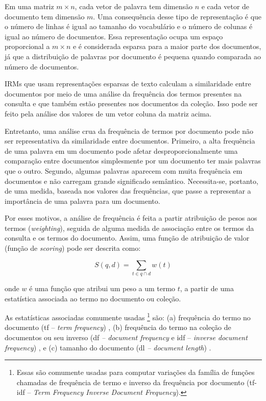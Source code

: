 \documentclass[
	12pt,				%
	openright,			%
	oneside,			%
	a4paper,			%
	english,			%
	french,				%
	spanish,			%
	brazil				%
	]{abntex2}
\begin{document}
Em uma matriz $m \times n$, cada vetor de palavra tem dimensão $n$ e cada vetor de documento tem dimensão $m$.
Uma consequência desse tipo de representação é que o número de linhas é igual ao tamanho do vocabulário e o número de colunas é igual ao número de documentos.
Essa representação ocupa um espaço proporcional a $m \times n$ e é considerada esparsa para a maior parte dos documentos, já que a distribuição de palavras por documento é pequena quando comparada ao número de documentos.
\cite{JurafskyMartin2023}


IRMs que usam representações esparsas de texto calculam a similaridade entre documentos por meio de uma análise da frequência dos termos presentes na consulta e que também estão presentes nos documentos da coleção.
Isso pode ser feito pela análise dos valores de um vetor coluna da matriz acima.

Entretanto, uma análise crua da frequência de termos por documento pode não ser representativa da similaridade entre documentos.
Primeiro, a alta frequência de uma palavra em um documento pode afetar desproporcionalmente uma comparação entre documentos simplesmente por um documento ter mais palavras que o outro.
Segundo, algumas palavras aparecem com muita frequência em documentos e não
carregam grande significado semântico.
Necessita-se, portanto, de uma medida, baseada nos valores das frequências, que passe a representar
a importância de uma palavra para um documento.

Por esses motivos, a análise de frequência é feita a partir atribuição de pesos aos termos (\textit{weighting}), seguida de alguma medida de associação entre os termos da consulta e os termos do documento.
Assim, uma função de atribuição de valor (função de \textit{scoring}) pode ser descrita como: \cite{}

\begin{equation}
\label{eq:score}
    S(q,d) = \sum_{t \in q \cap d} w(t)
\end{equation}

onde $w$ é uma função que atribui um peso a um termo $t$, a partir de uma estatística associada ao termo no documento ou coleção.

As estatísticas associadas comumente usadas
\footnote{Essas são comumente usadas para computar variações da família de funções chamadas de frequência de termo e inverso da frequência por documento (tf-idf -- \textit{Term Frequency Inverse Document Frequency}).}
são:
(a) frequência do termo no documento (tf -- \textit{term frequency})
, (b) frequência do termo na coleção de documentos ou seu inverso (df \textit{-- document frequency} e idf { -- \textit{inverse document frequency}})
, e (c) tamanho do documento (dl \textit{-- document length})
. \cite{}
\end{document}
